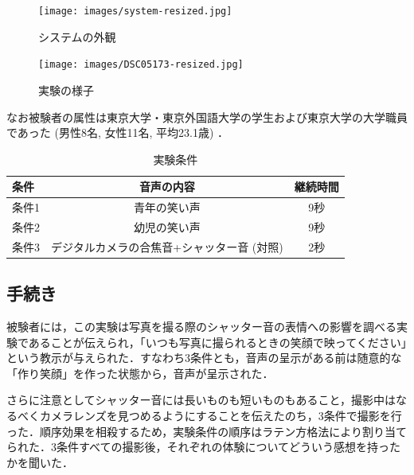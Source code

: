 \documentclass[report,10pt,uplatex,titlepage]{jsarticle}
\begin{document}
\begin{figure}[h!]
\begin{minipage}{0.49\columnwidth}
\begin{center}
\texttt{[image: images/system-resized.jpg]}
\end{center}
\caption{システムの外観}
  \label{system}
\end{minipage}
\begin{minipage}{0.49\columnwidth}
\begin{center}
\texttt{[image: images/DSC05173-resized.jpg]}
\end{center}
\caption{実験の様子}
  \label{yousu}
\end{minipage}
\end{figure}

\break

なお被験者の属性は東京大学・東京外国語大学の学生および東京大学の大学職員であった (男性8名, 女性11名, 平均23.1歳) ．
\begin{table}[htb]
  \begin{center}
    \caption{実験条件}
    \label{cond5}
    \begin{tabular}{|l|c|c|} \hline
      条件 & 音声の内容 & 継続時間 \\ \hline  \hline
      条件1 & 青年の笑い声 & 9秒\\ \hline 
      条件2 & 幼児の笑い声 & 9秒 \\ \hline
      条件3 & デジタルカメラの合焦音+シャッター音 (対照) & 2秒 \\ \hline
    \end{tabular}
  \end{center}
\end{table}




\subsection{手続き}
\label{手続き}

被験者には，この実験は写真を撮る際のシャッター音の表情への影響を調べる実験であることが伝えられ，「いつも写真に撮られるときの笑顔で映ってください」という教示が与えられた．すなわち3条件とも，音声の呈示がある前は随意的な「作り笑顔」を作った状態から，音声が呈示された．

さらに注意としてシャッター音には長いものも短いものもあること，撮影中はなるべくカメラレンズを見つめるようにすることを伝えたのち，3条件で撮影を行った．順序効果を相殺するため，実験条件の順序はラテン方格法により割り当てられた．3条件すべての撮影後，それぞれの体験についてどういう感想を持ったかを聞いた．
\end{document}
